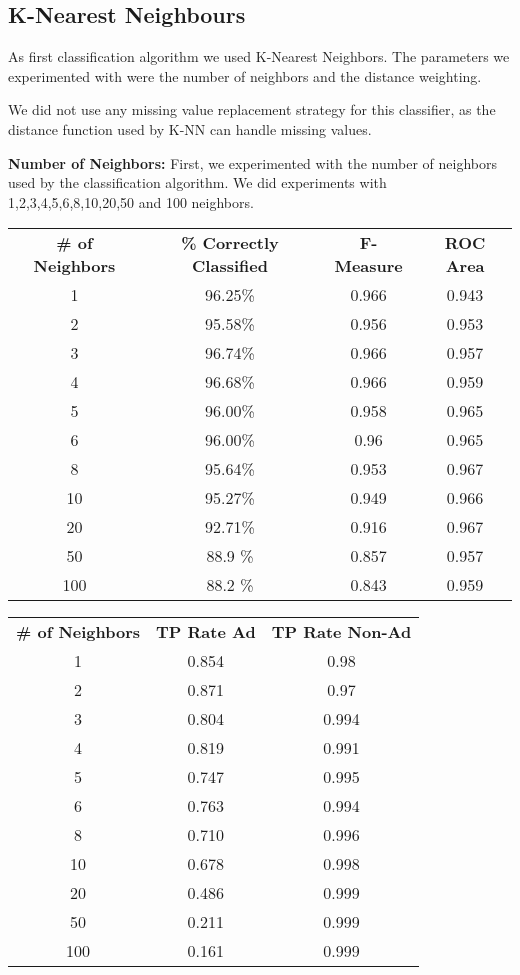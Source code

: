 \documentclass{sig-alternate-05-2015}
\begin{document}
{\subsection{K-Nearest Neighbours}
As first classification algorithm we used K-Nearest Neighbors. The parameters we experimented with were the number of neighbors and the distance weighting.

We did not use any missing value replacement strategy for this classifier, as the distance function used by K-NN can handle missing values. 

\textbf{Number of Neighbors:}
First, we experimented with the number of neighbors used by the classification algorithm. We did experiments with 1,2,3,4,5,6,8,10,20,50 and 100 neighbors.

\begin{center}
\begin{tabular}{ c | c | c | c}
\textbf{\# of Neighbors} & \textbf{\% Correctly Classified} & \textbf{F-Measure} & \textbf{ROC Area}\\
1   & 96.25\% & 0.966 & 0.943\\
2   & 95.58\% & 0.956 & 0.953\\
3   & 96.74\% & 0.966 & 0.957\\
4   & 96.68\% & 0.966 & 0.959\\
5   & 96.00\% & 0.958 & 0.965\\
6   & 96.00\% & 0.96  & 0.965\\
8   & 95.64\% & 0.953 & 0.967\\
10  & 95.27\% & 0.949 & 0.966\\
20  & 92.71\% & 0.916 & 0.967\\
50  & 88.9 \% & 0.857 & 0.957\\
100 & 88.2 \% & 0.843 & 0.959\\
\end{tabular}
\end{center}

\begin{center}
\begin{tabular}{ c | c | c}
\textbf{\# of Neighbors} & \textbf{TP Rate Ad} & \textbf{TP Rate Non-Ad}\\
1   & 0.854 & 0.98\\
2   & 0.871 & 0.97\\
3   & 0.804 & 0.994\\
4   & 0.819 & 0.991\\
5   & 0.747 & 0.995\\
6   & 0.763 & 0.994\\
8   & 0.710 & 0.996\\
10  & 0.678 & 0.998\\
20  & 0.486 & 0.999\\
50  & 0.211 & 0.999\\
100 & 0.161 & 0.999\\
\end{tabular}
\end{center}

}
\end{document}
